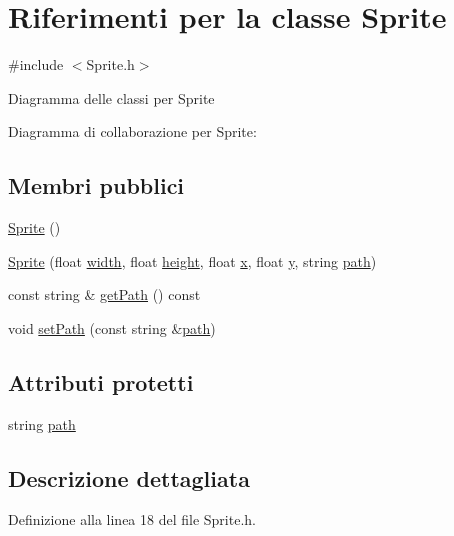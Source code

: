 \hypertarget{class_sprite}{}\section{Riferimenti per la classe Sprite}
\label{class_sprite}


{\ttfamily \#include $<$Sprite.\+h$>$}



Diagramma delle classi per Sprite


Diagramma di collaborazione per Sprite\+:
\subsection*{Membri pubblici}
\begin{DoxyCompactItemize}
\item 
\hyperlink{class_sprite_a12cba3ac1868418add3c4d95ce87e615}{Sprite} ()
\item 
\hyperlink{class_sprite_a637199c9e346e719beb622761fbf6ce5}{Sprite} (float \hyperlink{class_game_object_af797cec05ff1d3cbc694fc7036add37b}{width}, float \hyperlink{class_game_object_a0ae9c255f47b6148c26d0333a72d0625}{height}, float \hyperlink{class_game_object_ad4976cd29785cf9bd791148ff397c41e}{x}, float \hyperlink{class_game_object_a9ac54f1c686ecf5656139a829ed62041}{y}, string \hyperlink{class_sprite_a8f128f4a40eb996f611c64c7d41b1584}{path})
\item 
const string \& \hyperlink{class_sprite_aad7770d311d6e4f6783206bebad9c0ad}{get\+Path} () const
\item 
void \hyperlink{class_sprite_ac688bf8902344f265714447e6aa3a391}{set\+Path} (const string \&\hyperlink{class_sprite_a8f128f4a40eb996f611c64c7d41b1584}{path})
\end{DoxyCompactItemize}
\subsection*{Attributi protetti}
\begin{DoxyCompactItemize}
\item 
string \hyperlink{class_sprite_a8f128f4a40eb996f611c64c7d41b1584}{path}
\end{DoxyCompactItemize}


\subsection{Descrizione dettagliata}


Definizione alla linea 18 del file Sprite.\+h.



